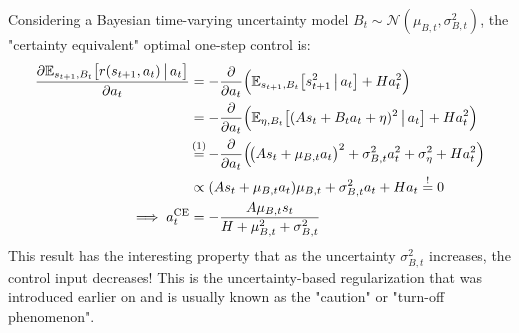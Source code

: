 			Considering a Bayesian time-varying uncertainty model \( B_t \sim \mathcal{N}(\mu_{B, t}, \sigma_{B, t}^2) \), the "certainty equivalent" optimal one-step control is:
			\begin{align*}
				 &                                                                                             & \pdv{\E_{s_{t + 1}, B_t}\big[ r(s_{t + 1}, a_t) \biggiven a_t \big]}{a_t}
				 & = -\pdv{a_t} \Big( \E_{s_{t + 1}, B_t}\big[ s_{t + 1}^2 \biggiven a_t \big] + H a_t^2 \Big) &                                                                                                                                                                                                                       \\
				 &                                                                                             &                                                                           & = -\pdv{a_t} \Big( \E_{\eta, B_t}\big[ (A s_t + B_t a_t + \eta)^2 \biggiven a_t \big] + H a_t^2 \Big)                                   & \\
				 &                                                                                             &                                                                           & \oversetfootnotemark{=} -\pdv{a_t} \Big(\! \big( A s_t + \mu_{B, t} a_t \big)^2 + \sigma_{B, t}^2 a_t^2 + \sigma_\eta^2 + H a_t^2 \Big) & \\
				 &                                                                                             &                                                                           & \propto (A s_t + \mu_{B, t} a_t) \mu_{B, t} + \sigma_{B, t}^2 a_t + H a_t \overset{!}{=} 0                                              & \\
				 &                                                                                             & \implies a_t^\mathrm{CE}                                                  & = -\frac{A \mu_{B, t} s_t}{H + \mu_{B, t}^2 + \sigma_{B, t}^2}
			\end{align*}
			This result has the interesting property that as the uncertainty \( \sigma_{B, t}^2 \) increases, the control input decreases! This is the uncertainty-based regularization that was introduced earlier on and is usually known as the "caution" or "turn-off phenomenon".

